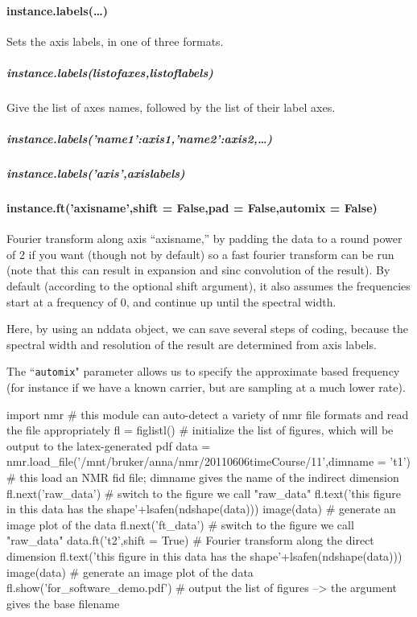 \paragraph{instance.labels(\ldots)}
Sets the axis labels, in one of three formats.
\subparagraph{instance.labels(listofaxes,listoflabels)}
Give the list of axes names, followed by the list of their label axes.
\subparagraph{instance.labels({'name1':axis1,'name2':axis2,\ldots})}
\subparagraph{instance.labels('axis',axislabels)}
\paragraph{instance.ft('axisname',shift = False,pad = False,automix = False)}
Fourier transform along axis ``axisname,'' by padding the data to a round power of 2 if you want (though not by default) so a fast fourier transform can be run (note that this can result in expansion and sinc convolution of the result).
By default (according to the optional shift argument),
    it also assumes the frequencies start at a frequency of 0,
    and continue up until the spectral width.

Here, by using an nddata object, we can save several steps of coding,
    because the spectral width and resolution of the result are determined from
    axis labels.

The ``\texttt{automix}" parameter allows us to specify the approximate based frequency (for instance if we have a known carrier, but are sampling at a much lower rate).
    
\begin{python}
import nmr # this module can auto-detect a variety of nmr file formats and read the file appropriately
fl = figlistl() # initialize the list of figures, which will be output to the latex-generated pdf
data = nmr.load_file('/mnt/bruker/anna/nmr/20110606timeCourse/11',dimname = 't1') # this load an NMR fid file; dimname gives the name of the indirect dimension
fl.next('raw_data') # switch to the figure we call "raw_data"
fl.text('this figure in this data has the shape'+lsafen(ndshape(data)))
image(data) # generate an image plot of the data
fl.next('ft_data') # switch to the figure we call "raw_data"
data.ft('t2',shift = True) # Fourier transform along the direct dimension
fl.text('this figure in this data has the shape'+lsafen(ndshape(data)))
image(data) # generate an image plot of the data
fl.show('for_software_demo.pdf') # output the list of figures --> the argument gives the base filename
\end{python}
